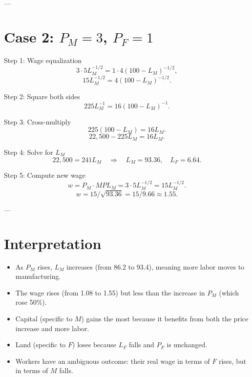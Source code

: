 \documentclass[12pt]{article}
\begin{document}
---

\section*{Case 2: $P_M = 3$, $P_F = 1$}

\noindent Step 1: Wage equalization
\[
3 \cdot 5L_M^{-1/2} = 1 \cdot 4(100 - L_M)^{-1/2},
\]
\[
15L_M^{-1/2} = 4(100 - L_M)^{-1/2}.
\]

\bigskip
\noindent Step 2: Square both sides
\[
225L_M^{-1} = 16(100 - L_M)^{-1}.
\]

\bigskip
\noindent Step 3: Cross-multiply
\[
225(100 - L_M) = 16L_M.
\]
\[
22{,}500 - 225L_M = 16L_M.
\]

\bigskip
\noindent Step 4: Solve for $L_M$
\[
22{,}500 = 241L_M \quad \Rightarrow \quad \boxed{L_M = 93.36, \quad L_F = 6.64.}
\]

\bigskip
\noindent Step 5: Compute new wage
\[
w = P_M \cdot MPL_M = 3 \cdot 5L_M^{-1/2} = 15L_M^{-1/2}.
\]
\[
w = 15 / \sqrt{93.36} = 15 / 9.66 \approx \boxed{1.55.}
\]

---

\section*{Interpretation}

\begin{itemize}
\item As $P_M$ rises, $L_M$ increases (from 86.2 to 93.4), meaning more labor moves to manufacturing.  
\item The wage rises (from 1.08 to 1.55) but less than the increase in $P_M$ (which rose 50\%).  
\item Capital (specific to $M$) gains the most because it benefits from both the price increase and more labor.  
\item Land (specific to $F$) loses because $L_F$ falls and $P_F$ is unchanged.  
\item Workers have an ambiguous outcome: their real wage in terms of $F$ rises, but in terms of $M$ falls.
\end{itemize}
\end{document}
